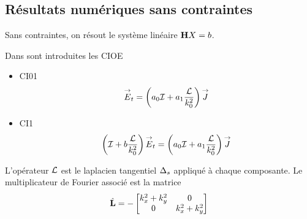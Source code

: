   \subsection{Résultats numériques sans contraintes}

      Sans contraintes, on résout le système linéaire \(\mathbf{H} X = b\). 

      Dans \cite{stupfel_implementation_2015} sont introduites les CIOE
      \begin{itemize}
        \item CI01
          \begin{equation*}
            {\overset{\rightarrow}{E}}_t = \left(a_0{\mathcal{I}} + a_1\dfrac{\mathcal{L}}{k_0^2}\right){\overset{\rightarrow}{J}}
          \end{equation*}
        \item CI1
          \begin{equation*}
            \left({\mathcal{I}} + b\dfrac{\mathcal{L}}{k_0^2} \right){\overset{\rightarrow}{E}}_t = \left(a_0{\mathcal{I}} + a_1\dfrac{\mathcal{L}}{k_0^2}\right){\overset{\rightarrow}{J}}
          \end{equation*}
      \end{itemize}

      L'opérateur \(\mathcal{L}\) est le laplacien tangentiel \(\Delta_s\) appliqué à chaque composante. Le multiplicateur de Fourier associé est la matrice
      \begin{equation*}
        \hat{\mathbf{L}}  = -
        \begin{bmatrix}
          k_x^2 + k_y^2 & 0
          \\
          0 & k_x^2 + k_y^2
        \end{bmatrix}
      \end{equation*}

